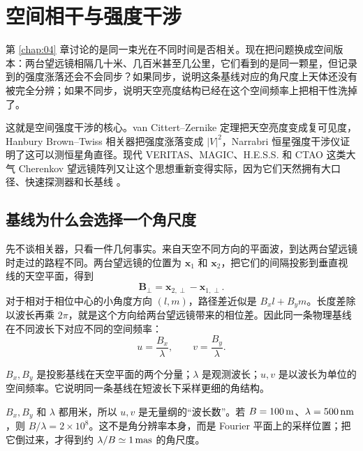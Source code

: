 \chapter{空间相干与强度干涉}
\label{chap:05}

\begin{chapteropening}
第 \ref{chap:04} 章讨论的是同一束光在不同时间是否相关。现在把问题换成空间版本：两台望远镜相隔几十米、几百米甚至几公里，它们看到的是同一颗星，但记录到的强度涨落还会不会同步？如果同步，说明这条基线对应的角尺度上天体还没有被完全分辨；如果不同步，说明天空亮度结构已经在这个空间频率上把相干性洗掉了。

这就是空间强度干涉的核心。van Cittert--Zernike 定理把天空亮度变成复可见度，Hanbury Brown--Twiss 相关器把强度涨落变成 \(|V|^2\)，Narrabri 恒星强度干涉仪证明了这可以测恒星角直径。现代 VERITAS、MAGIC、H.E.S.S. 和 CTAO 这类大气 Cherenkov 望远镜阵列又让这个思想重新变得实际，因为它们天然拥有大口径、快速探测器和长基线 \citep{1938Phy.....5..785Z,1939Phy.....6.1129V,1956Natur.177...27B,1957RSPSA.242..300B,1958RSPSA.248..222B,1967MNRAS.137..375H,1967MNRAS.137..393H,1974iiia.book.....H,2006ApJ...649..399L,2013APh....43..331D,2020NatAs...4.1164A,2024MNRAS.529.4387A}。
\end{chapteropening}

\section{基线为什么会选择一个角尺度}

先不谈相关器，只看一件几何事实。来自天空不同方向的平面波，到达两台望远镜时走过的路程不同。两台望远镜的位置为 \(\mathbf{x}_1\) 和 \(\mathbf{x}_2\)，把它们的间隔投影到垂直视线的天空平面，得到
\[
  \mathbf{B}_\perp=\mathbf{x}_{2,\perp}-\mathbf{x}_{1,\perp}.
\]
对于相对于相位中心的小角度方向 \((l,m)\)，路径差近似是 \(B_x l+B_y m\)。长度差除以波长再乘 \(2\pi\)，就是这个方向给两台望远镜带来的相位差。因此同一条物理基线在不同波长下对应不同的空间频率：
\begin{equation}
  u=\frac{B_x}{\lambda},
  \qquad
  v=\frac{B_y}{\lambda}.
  \label{eq:ch05-uv}
\end{equation}
\begin{formulaexplain}
\(B_x,B_y\) 是投影基线在天空平面的两个分量；\(\lambda\) 是观测波长；\(u,v\) 是以波长为单位的空间频率。它说明同一条基线在短波长下采样更细的角结构。
\end{formulaexplain}
\(B_x,B_y\) 和 \(\lambda\) 都用米，所以 \(u,v\) 是无量纲的“波长数”。若 \(B=100\,{\rm m}\)、\(\lambda=500\,{\rm nm}\)，则 \(B/\lambda=2\times10^8\)。这不是角分辨率本身，而是 Fourier 平面上的采样位置；把它倒过来，才得到约 \(\lambda/B\simeq1\,{\rm mas}\) 的角尺度。

